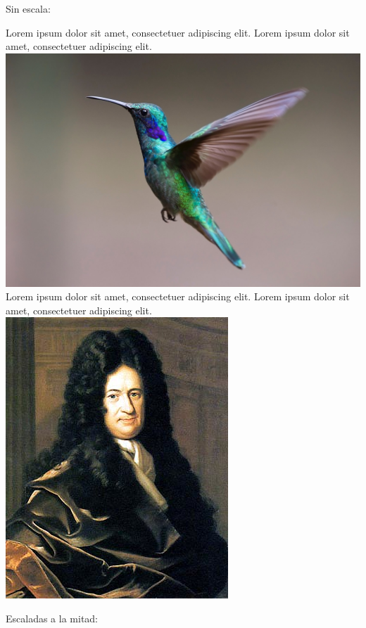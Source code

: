 \documentclass[12pt,a4paper,twoside]{article}
\begin{document}
Sin escala:

\noindent Lorem ipsum dolor sit amet, consectetuer adipiscing elit. Lorem ipsum dolor sit amet, consectetuer adipiscing elit.\\
\noindent\includegraphics{images/bird.jpg}\\
\noindent Lorem ipsum dolor sit amet, consectetuer adipiscing elit. Lorem ipsum dolor sit amet, consectetuer adipiscing elit.\\
\noindent\includegraphics{images/GWLeibniz.png}

Escaladas a la mitad:
\end{document}
